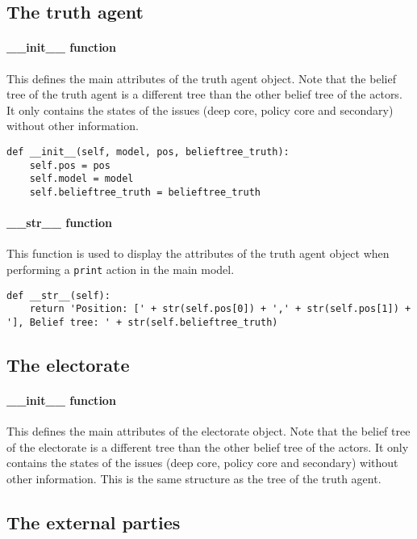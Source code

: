 \subsection{The truth agent}

\paragraph{\_\_init\_\_ function} This defines the main attributes of the truth agent object. Note that the belief tree of the truth agent is a different tree than the other belief tree of the actors. It only contains the states of the issues (deep core, policy core and secondary) without other information.

\begin{lstlisting}
def __init__(self, model, pos, belieftree_truth):
	self.pos = pos
	self.model = model
	self.belieftree_truth = belieftree_truth
\end{lstlisting}

\paragraph{\_\_str\_\_ function} This function is used to display the attributes of the truth agent object when performing a \texttt{print} action in the main model.

\begin{lstlisting}
def __str__(self):
	return 'Position: [' + str(self.pos[0]) + ',' + str(self.pos[1]) + '], Belief tree: ' + str(self.belieftree_truth)
\end{lstlisting}

\subsection{The electorate}

\paragraph{\_\_init\_\_ function} This defines the main attributes of the electorate object. Note that the belief tree of the electorate is a different tree than the other belief tree of the actors. It only contains the states of the issues (deep core, policy core and secondary) without other information. This is the same structure as the tree of the truth agent.

\subsection{The external parties}

